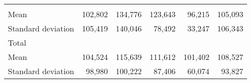 \begin{tabular}{llllll}
  \multicolumn{1}{|r}{} &
  \multicolumn{1}{r}{} &
  \multicolumn{1}{r}{} &
  \multicolumn{1}{r}{} &
  \multicolumn{1}{r}{} \\
\multicolumn{1}{l}{\hspace{4em}Mean} &
  \multicolumn{1}{|r}{102,802} &
  \multicolumn{1}{r}{134,776} &
  \multicolumn{1}{r}{123,643} &
  \multicolumn{1}{r}{96,215} &
  \multicolumn{1}{r}{105,093} \\
\multicolumn{1}{l}{\hspace{4em}Standard deviation} &
  \multicolumn{1}{|r}{105,419} &
  \multicolumn{1}{r}{140,046} &
  \multicolumn{1}{r}{78,492} &
  \multicolumn{1}{r}{33,247} &
  \multicolumn{1}{r}{106,343} \\
\multicolumn{1}{l}{\hspace{3em}Total} &
  \multicolumn{1}{|r}{} &
  \multicolumn{1}{r}{} &
  \multicolumn{1}{r}{} &
  \multicolumn{1}{r}{} &
  \multicolumn{1}{r}{} \\
\multicolumn{1}{l}{\hspace{4em}Mean} &
  \multicolumn{1}{|r}{104,524} &
  \multicolumn{1}{r}{115,639} &
  \multicolumn{1}{r}{111,612} &
  \multicolumn{1}{r}{101,402} &
  \multicolumn{1}{r}{108,527} \\
\multicolumn{1}{l}{\hspace{4em}Standard deviation} &
  \multicolumn{1}{|r}{98,980} &
  \multicolumn{1}{r}{100,222} &
  \multicolumn{1}{r}{87,406} &
  \multicolumn{1}{r}{60,074} &
  \multicolumn{1}{r}{93,827} \\
\cline{1-6}
\end{tabular}

